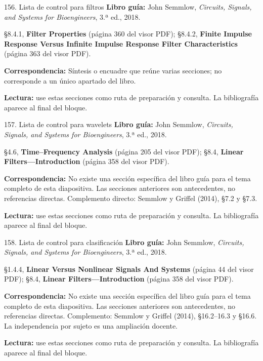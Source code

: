 \documentclass[
  10pt,
  ignorenonframetext,
  aspectratio=169,
  spanish,
]{beamer}
\begin{document}
\begin{frame}{156. Lista de control para filtros}
\label{lista-de-control-para-filtros}
\textbf{Libro guía:} John Semmlow, \emph{Circuits, Signals, and Systems
for Bioengineers}, 3.ª ed., 2018.

§8.4.1, \textbf{Filter Properties} (página 360 del visor PDF); §8.4.2,
\textbf{Finite Impulse Response Versus Infinite Impulse Response Filter
Characteristics} (página 363 del visor PDF).

\textbf{Correspondencia:} Síntesis o encuadre que reúne varias
secciones; no corresponde a un único apartado del libro.

\textbf{Lectura:} use estas secciones como ruta de preparación y
consulta. La bibliografía aparece al final del bloque.
\end{frame}

\begin{frame}{157. Lista de control para wavelets}
\label{lista-de-control-para-wavelets}
\textbf{Libro guía:} John Semmlow, \emph{Circuits, Signals, and Systems
for Bioengineers}, 3.ª ed., 2018.

§4.6, \textbf{Time--Frequency Analysis} (página 205 del visor PDF);
§8.4, \textbf{Linear Filters---Introduction} (página 358 del visor PDF).

\textbf{Correspondencia:} No existe una sección específica del libro
guía para el tema completo de esta diapositiva. Las secciones anteriores
son antecedentes, no referencias directas. Complemento directo: Semmlow
y Griffel (2014), §7.2 y §7.3.

\textbf{Lectura:} use estas secciones como ruta de preparación y
consulta. La bibliografía aparece al final del bloque.
\end{frame}

\begin{frame}{158. Lista de control para clasificación}
\label{lista-de-control-para-clasificaciuxf3n}
\textbf{Libro guía:} John Semmlow, \emph{Circuits, Signals, and Systems
for Bioengineers}, 3.ª ed., 2018.

§1.4.4, \textbf{Linear Versus Nonlinear Signals And Systems} (página 44
del visor PDF); §8.4, \textbf{Linear Filters---Introduction} (página 358
del visor PDF).

\textbf{Correspondencia:} No existe una sección específica del libro
guía para el tema completo de esta diapositiva. Las secciones anteriores
son antecedentes, no referencias directas. Complemento: Semmlow y
Griffel (2014), §16.2--16.3 y §16.6. La independencia por sujeto es una
ampliación docente.

\textbf{Lectura:} use estas secciones como ruta de preparación y
consulta. La bibliografía aparece al final del bloque.
\end{frame}
\end{document}
